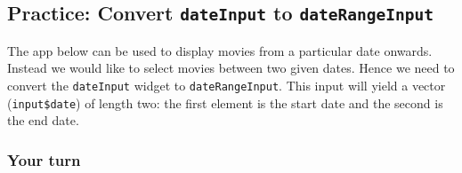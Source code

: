 \documentclass[
  letterpaper,
  DIV=11,
  numbers=noendperiod]{scrreprt}
\newenvironment{Shaded}{\begin{snugshade}}{\end{snugshade}}
\newcommand{\AttributeTok}[1]{\textcolor[rgb]{0.40,0.46,0.14}{#1}}
\newcommand{\CommentTok}[1]{\textcolor[rgb]{0.37,0.37,0.37}{#1}}
\newcommand{\ConstantTok}[1]{\textcolor[rgb]{0.56,0.35,0.01}{#1}}
\newcommand{\DecValTok}[1]{\textcolor[rgb]{0.68,0.00,0.00}{#1}}
\newcommand{\FunctionTok}[1]{\textcolor[rgb]{0.28,0.35,0.67}{#1}}
\newcommand{\NormalTok}[1]{\textcolor[rgb]{0.00,0.46,0.62}{#1}}
\newcommand{\OtherTok}[1]{\textcolor[rgb]{0.00,0.46,0.62}{#1}}
\newcommand{\SpecialCharTok}[1]{\textcolor[rgb]{0.37,0.37,0.37}{#1}}
\begin{document}
\begin{Shaded}
\end{Shaded}

\hypertarget{practice-convert-dateinput-to-daterangeinput}{%
\subsection{\texorpdfstring{Practice: Convert \texttt{dateInput} to
\texttt{dateRangeInput}}{Practice: Convert dateInput to dateRangeInput}}\label{practice-convert-dateinput-to-daterangeinput}}

The app below can be used to display movies from a particular date
onwards. Instead we would like to select movies between two given dates.
Hence we need to convert the \texttt{dateInput} widget to
\texttt{dateRangeInput}. This input will yield a vector
(\texttt{input\$date}) of length two: the first element is the start
date and the second is the end date.

\hypertarget{your-turn-9}{%
\subsubsection{Your turn}\label{your-turn-9}}
\end{document}
